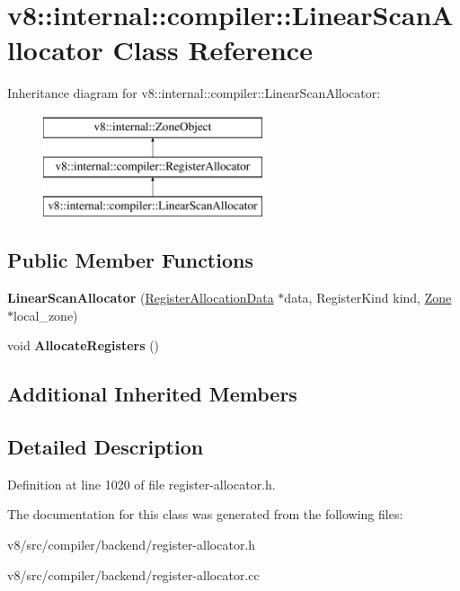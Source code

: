 \hypertarget{classv8_1_1internal_1_1compiler_1_1LinearScanAllocator}{}\section{v8\+:\+:internal\+:\+:compiler\+:\+:Linear\+Scan\+Allocator Class Reference}
\label{classv8_1_1internal_1_1compiler_1_1LinearScanAllocator}
Inheritance diagram for v8\+:\+:internal\+:\+:compiler\+:\+:Linear\+Scan\+Allocator\+:\begin{figure}[H]
\begin{center}
\leavevmode
\includegraphics[height=3.000000cm]{classv8_1_1internal_1_1compiler_1_1LinearScanAllocator}
\end{center}
\end{figure}
\subsection*{Public Member Functions}
\begin{DoxyCompactItemize}
\item 
\mbox{\label{classv8_1_1internal_1_1compiler_1_1LinearScanAllocator_ac36a7cdac3c23f89dbf157037b45945b}} 
{\bfseries Linear\+Scan\+Allocator} (\mbox{\hyperlink{classv8_1_1internal_1_1compiler_1_1RegisterAllocationData}{Register\+Allocation\+Data}} $\ast$data, Register\+Kind kind, \mbox{\hyperlink{classv8_1_1internal_1_1Zone}{Zone}} $\ast$local\+\_\+zone)
\item 
\mbox{\label{classv8_1_1internal_1_1compiler_1_1LinearScanAllocator_af090759a2b6c76166a297fe5343fbbe9}} 
void {\bfseries Allocate\+Registers} ()
\end{DoxyCompactItemize}
\subsection*{Additional Inherited Members}


\subsection{Detailed Description}


Definition at line 1020 of file register-\/allocator.\+h.



The documentation for this class was generated from the following files\+:\begin{DoxyCompactItemize}
\item 
v8/src/compiler/backend/register-\/allocator.\+h\item 
v8/src/compiler/backend/register-\/allocator.\+cc\end{DoxyCompactItemize}
